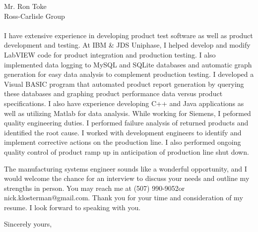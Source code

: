 \documentclass{letter} %
\makeatletter
\newcommand{\contactperson}{Mr. Ron Toke}
\newcommand{\contactCompany}{Ross-Carlisle Group}
\newcommand{\contactStreetAddress}{ }  %
\newcommand{\contactCityStateZip}{ }
\newcommand{\position}{manufacturing systems engineer }%
\newcommand{\personalphonenumber}{(507) 990-9052}
\newcommand{\personalemail}{nick.klosterman@gmail.com}
\makeatother
\begin{document}
\begin{letter}{\contactperson \\
\contactCompany \\
\contactStreetAddress \\
\contactCityStateZip

}
\noindent
I have extensive experience in developing product test software as well as product development and testing.
At IBM \& JDS Uniphase, I helped develop and modify LabVIEW code for product integration and production testing.
I also implemented data logging to MySQL and SQLite databases and automatic graph generation for easy data analysis to complement production testing.
I developed a Visual BASIC program that automated product report generation by querying these databases and graphing product performance data versus product specifications.
I also have experience developing C++ and Java applications as well as utilizing Matlab for data analysis.
While working for Siemens, I peformed quality engineering duties.
I performed failure analysis of returned products and identified the root cause. I worked with development engineers to identify and implement corrective actions on the production line.
I also performed ongoing quality control of product ramp up in anticipation of production line shut down.

 
\noindent 
The \position sounds like a wonderful opportunity, and I would welcome the chance for an interview to discuss your needs and outline my strengths in person. 
You may reach me at \personalphonenumber  or \personalemail.
Thank you for your time and consideration of my resume. I look forward to speaking with you.
 

\closing{Sincerely yours,} 
 

 

\end{letter}
 
\end{document}
